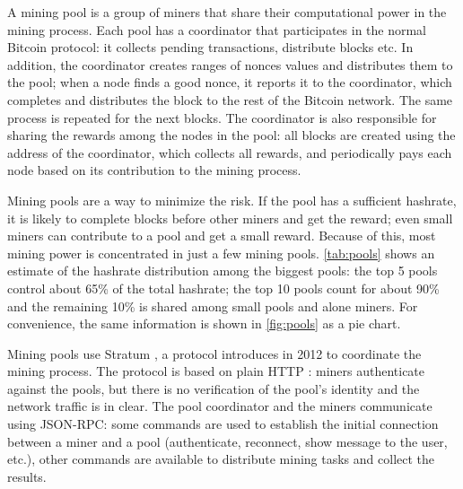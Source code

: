 \medskip
A mining pool is a group of miners that share their computational power in the mining process.
Each pool has a coordinator that participates in the normal Bitcoin protocol:
it collects pending transactions, distribute blocks etc.
In addition, the coordinator creates ranges of nonces values and distributes them to the pool;
when a node finds a good nonce, it reports it to the coordinator, which completes and distributes the block to the rest of the Bitcoin network.
The same process is repeated for the next blocks.
The coordinator is also responsible for sharing the rewards among the nodes in the pool:
all blocks are created using the address of the coordinator, which collects all rewards, and periodically pays each node based on its contribution to the mining process.

\medskip
Mining pools are a way to minimize the risk.
If the pool has a sufficient hashrate, it is likely to complete blocks before other miners and get the reward;
even small miners can contribute to a pool and get a small reward.
Because of this, most mining power is concentrated in just a few mining pools.
\cref{tab:pools} shows an estimate of the hashrate distribution among the biggest pools:
the top \num{5} pools control about \num{65}\% of the total hashrate;
the top \num{10} pools count for about \num{90}\% and the remaining \num{10}\% is shared among small pools and alone miners.
For convenience, the same information is shown in \cref{fig:pools} as a pie chart.

\medskip
Mining pools use Stratum \cite{stratum}, a protocol introduces in \num{2012} to coordinate the mining process.
The protocol is based on plain HTTP \cite{stratum_manual}:
miners authenticate against the pools, but there is no verification of the pool's identity and the network traffic is in clear.
The pool coordinator and the miners communicate using JSON-RPC:
some commands are used to establish the initial connection between a miner and a pool (authenticate, reconnect, show message to the user, etc.), other commands are available to distribute mining tasks and collect the results.

\pagebreak

